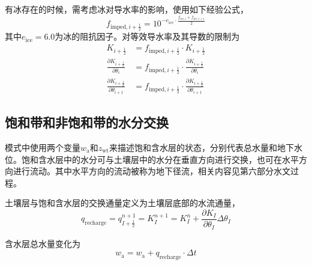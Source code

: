 有冰存在的时候，需考虑冰对导水率的影响，使用如下经验公式，
\begin{equation}
  {f}_{\mathrm{imped},i+\frac{1}{2}}=10^{-e_{\mathrm{ice}}\cdot\frac{f_{\mathrm{ice},i}+f_{\mathrm{ice},i +1}}{2}}
\end{equation}
其中$e_{\mathrm{ice}}=6.0$为冰的阻抗因子。对等效导水率及其导数的限制为
\begin{equation}
  \begin{aligned}
    K_{i+\frac{1}{2}} & = {f}_{\mathrm{imped},i+\frac{1}{2}} \cdot K_{i+\frac{1}{2}} \\
    \frac{\partial K_{i+\frac{1}{2}}}{\partial \theta_{i}}
    & = {f}_{\mathrm{imped},i+\frac{1}{2}} \cdot \frac{\partial K_{i+\frac{1}{2}}}{\partial \theta_{i}} \\
    \frac{\partial K_{i+\frac{1}{2}}}{\partial \theta_{i+1}} & =
    {f}_{\mathrm{imped},i+\frac{1}{2}} \cdot \frac{\partial K_{i+\frac{1}{2}}}{\partial \theta_{i+1}}
  \end{aligned}
\end{equation}

\subsection{饱和带和非饱和带的水分交换} \label{sec:exchange_sat_unsat}
模式中使用两个变量$w_{\mathrm {a}} $和$z_{\mathrm{wt}}$来描述饱和含水层的状态，分别代表总水量和地下水位。饱和含水层中的水分可与土壤层中的水分在垂直方向进行交换，也可在水平方向进行流动。其中水平方向的流动被称为地下径流，相关内容见第六部分水文过程。

土壤层与饱和含水层的交换通量定义为土壤层底部的水流通量，
\begin{equation}
  {q}_{\mathrm{recharge}}=q_{I+\frac{1}{2}}^{n+1}=K_{I}^{n+1} = K_I^n + \frac{\partial K_{I}}{\partial \theta_{I}} \Delta \theta_{I}
\end{equation}

含水层总水量变化为
\begin{equation}
  w_{\mathrm{a}}=w_{\mathrm{a}}+q_{\mathrm{recharge}} \cdot \Delta t
\end{equation}

